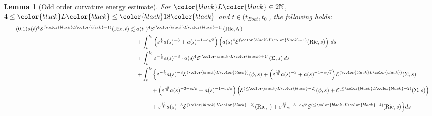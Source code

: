 \documentclass[11pt,leqno,textwidth=10cm]{amsart}
\numberwithin{equation}{section}
\theoremstyle{definition}
\theoremstyle{plain}
\newtheorem{lemma}[definition]{Lemma}
\newcommand{\1}{\mathbbm{1}}
\newcommand{\E}{\mathcal{E}}
\newcommand{\N}{\mathbb{N}}
\newcommand{\Ric}{\text{\normalfont{Ric}}}
\newcommand{\Z}{\mathbb{Z}}
\renewcommand{\epsilon}{\varepsilon}
\newcommand{\numberthis}{\addtocounter{equation}{1}\tag{\theequation}}
\renewcommand{\theequation}{\arabic{section}.\arabic{equation}}
\newcommand{\todo}[1]{\textcolor{red}{#1}}
\newcommand{\change}[1]{\color{black}#1\color{black}}
\begin{document}
\begin{lemma}[\change{Odd }order curvature energy estimate]\label{lem:en-est-Ric-top} For $\change{L}\in2\N$, $4\leq \change{L}\leq \change{18}$ and $t\in(t_{Boot},t_0]$, the following holds:
\begin{align*}
\numberthis\label{eq:en-est-Ric-top}a(t)^4\E^{(\change{L}-1)}(\Ric,t)\lesssim&\,a(t_0)^4\E^{(\change{L}-1)}(\Ric,t_0)\\
&\,+\int_t^{t_0}\left(\epsilon^\frac18a(s)^{-3}+a(s)^{-1-c\sqrt{\epsilon}}\right)\left(a(s)^4\E^{(\change{L}-1)}(\Ric,s)\right)\,ds\\
&\,+\int_t^{t_0}\epsilon^{-\frac18}a(s)^{-3}\cdot a(s)^4\E^{(\change{L}+1)}(\Sigma,s)\,ds\\
&\,+\int_t^{t_0}\Bigr\{\epsilon^{-\frac18}a(s)^{-3}\E^{(\change{L})}(\phi,s)+\left(\epsilon^\frac{15}8a(s)^{-3}+a(s)^{-1-c\sqrt{\epsilon}}\right)\E^{(\change{L})}(\Sigma,s)\\
&\,\phantom{+\int_t^{t_0}}+\left(\epsilon^\frac{15}8a(s)^{-3-c\sqrt{\epsilon}}+a(s)^{-1-c\sqrt{\epsilon}}\right)\left(\E^{(\leq \change{L}-2)}(\phi,s)+\E^{(\leq \change{L}-2)}(\Sigma,s)\right)\\
&\,\phantom{+\int_t^{t_0}}+\epsilon^\frac{15}8a(s)^{-3}\E^{(\change{L}-2)}(\Ric,\cdot)+\epsilon^\frac{15}8a^{-3-c\sqrt{\epsilon}}\E^{(\leq \change{L}-4)}(\Ric,s)\Bigr\}ds
\end{align*}
\end{lemma}
\end{document}
